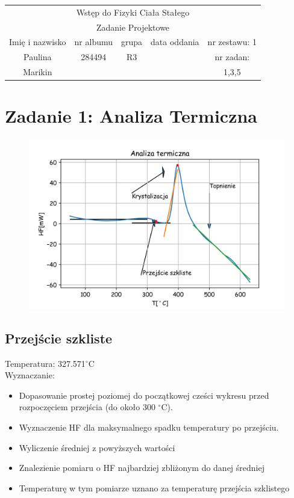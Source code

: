 \documentclass[a4paper,10pt]{article}
\def\arraystretch{1.2}
\begin{document}
\begin{table}
  \centering
  \def\arraystretch{1.5}
    \begin{tabular}{|c|c|c|c|c|} \hline
    \multicolumn{5}{|c|}{Wstęp do Fizyki Ciała Stałego}\\
		\multicolumn{5}{|c|}{Zadanie Projektowe} \\\hline
    Imię i nazwisko	&	nr albumu	&	grupa	&	data oddania	&	nr zestawu: 1	\\\hline
				Paulina			&		284494	&		R3	&								&	nr zadan:  \\
				Marikin			&						&				&								&	1,3,5 \\\hline
  \end{tabular}
\end{table}


\section{Zadanie 1: Analiza Termiczna}

\begin{figure}[H]
	\centering
		\includegraphics[width=\textwidth]{../Analiza_termiczna.png}
\end{figure}

\subsection{Przejście szkliste}
Temperatura: 327.571$^\circ$C \\
Wyznaczanie:
\begin{itemize}
	\item Dopasowanie prostej poziomej do początkowej cześci wykresu przed rozpoczęciem przejścia (do około 300 $^\circ$C).
	\item Wyznaczenie HF dla maksymalnego spadku temperatury po przejściu.
	\item Wyliczenie średniej z powyższych wartości
	\item Znalezienie pomiaru o HF najbardziej zbliżonym do danej średniej
	\item Temperaturę w tym pomiarze uznano za temperaturę przejścia szklistego
\end{itemize}
\end{document}

